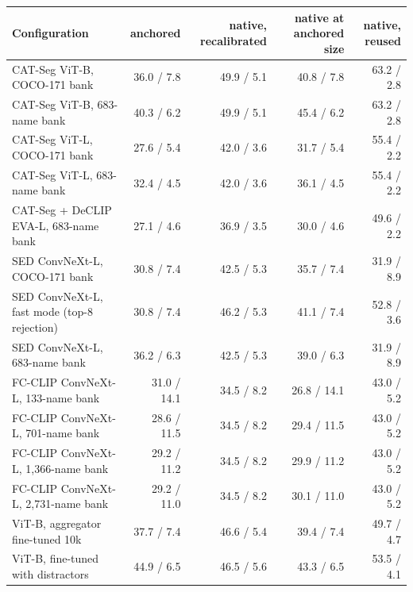 \begin{tabular}{@{}lrrrr@{}}
\toprule
Configuration & anchored & native, recalibrated & native at anchored size & native, reused \\
\midrule
CAT-Seg ViT-B, COCO-171 bank & 36.0 / 7.8 & 49.9 / 5.1 & 40.8 / 7.8 & 63.2 / 2.8 \\
CAT-Seg ViT-B, 683-name bank & 40.3 / 6.2 & 49.9 / 5.1 & 45.4 / 6.2 & 63.2 / 2.8 \\
CAT-Seg ViT-L, COCO-171 bank & 27.6 / 5.4 & 42.0 / 3.6 & 31.7 / 5.4 & 55.4 / 2.2 \\
CAT-Seg ViT-L, 683-name bank & 32.4 / 4.5 & 42.0 / 3.6 & 36.1 / 4.5 & 55.4 / 2.2 \\
CAT-Seg + DeCLIP EVA-L, 683-name bank & 27.1 / 4.6 & 36.9 / 3.5 & 30.0 / 4.6 & 49.6 / 2.2 \\
SED ConvNeXt-L, COCO-171 bank & 30.8 / 7.4 & 42.5 / 5.3 & 35.7 / 7.4 & 31.9 / 8.9 \\
SED ConvNeXt-L, fast mode (top-8 rejection) & 30.8 / 7.4 & 46.2 / 5.3 & 41.1 / 7.4 & 52.8 / 3.6 \\
SED ConvNeXt-L, 683-name bank & 36.2 / 6.3 & 42.5 / 5.3 & 39.0 / 6.3 & 31.9 / 8.9 \\
FC-CLIP ConvNeXt-L, 133-name bank & 31.0 / 14.1 & 34.5 / 8.2 & 26.8 / 14.1 & 43.0 / 5.2 \\
FC-CLIP ConvNeXt-L, 701-name bank & 28.6 / 11.5 & 34.5 / 8.2 & 29.4 / 11.5 & 43.0 / 5.2 \\
FC-CLIP ConvNeXt-L, 1,366-name bank & 29.2 / 11.2 & 34.5 / 8.2 & 29.9 / 11.2 & 43.0 / 5.2 \\
FC-CLIP ConvNeXt-L, 2,731-name bank & 29.2 / 11.0 & 34.5 / 8.2 & 30.1 / 11.0 & 43.0 / 5.2 \\
ViT-B, aggregator fine-tuned 10k & 37.7 / 7.4 & 46.6 / 5.4 & 39.4 / 7.4 & 49.7 / 4.7 \\
ViT-B, fine-tuned with distractors & 44.9 / 6.5 & 46.5 / 5.6 & 43.3 / 6.5 & 53.5 / 4.1 \\
\bottomrule
\end{tabular}
